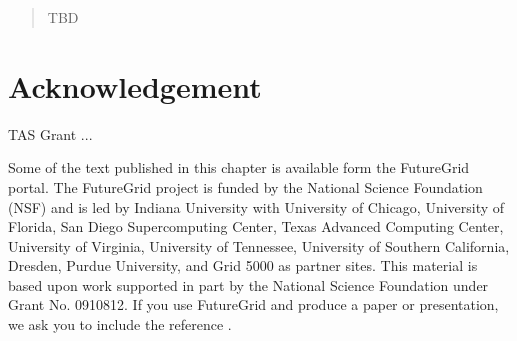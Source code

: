 \documentclass{sig-alternate}
\begin{document}
\tableofcontents

\newpage


\listoftodos

\newpage



\maketitle



\begin{abstract}

TBD

\end{abstract}



















\section*{Acknowledgement}

TAS Grant ... 

Some of the text published in this chapter is available form the
FutureGrid portal. The FutureGrid project is funded by the National
Science Foundation (NSF) and is led by Indiana University with
University of Chicago, University of Florida, San Diego Supercomputing
Center, Texas Advanced Computing Center, University of Virginia,
University of Tennessee, University of Southern California, Dresden,
Purdue University, and Grid 5000 as partner sites. This material is
based upon work supported in part by the National Science Foundation
under Grant No. 0910812. If you use FutureGrid and produce a paper or
presentation, we ask you to include the reference
\cite{las2010gce,las12fg-bookchapter}.





\end{document}
